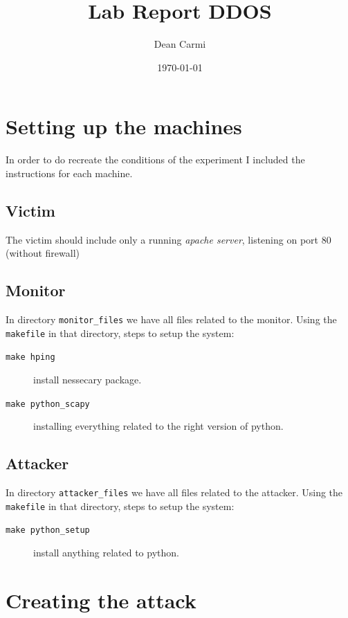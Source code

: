 \documentclass[11pt]{article}
\author{Dean Carmi}
\date{\today}
\title{Lab Report DDOS}
\begin{document}
\maketitle
\tableofcontents


\section{Setting up the machines}
\label{sec:orgcfe95e3}
In order to do recreate the conditions of the experiment I included the instructions for each machine.
\subsection{Victim}
\label{sec:org66a739f}
The victim should include only a running \emph{apache server}, listening on port 80 (without firewall) 
\subsection{Monitor}
\label{sec:orga4b1b25}
In directory \texttt{monitor\_files} we have all files related to the monitor.
Using the \texttt{makefile} in that directory, steps to setup the system:
\begin{description}
\item[{\texttt{make hping}}] install nessecary package.
\item[{\texttt{make python\_scapy}}] installing everything related to the right version of python.
\end{description}
\subsection{Attacker}
\label{sec:org6b260a3}
In directory \texttt{attacker\_files} we have all files related to the attacker.
Using the \texttt{makefile} in that directory, steps to setup the system:
\begin{description}
\item[{\texttt{make python\_setup}}] install anything related to python.
\end{description}

\section{Creating the attack}
\label{sec:org437663b}
\end{document}
